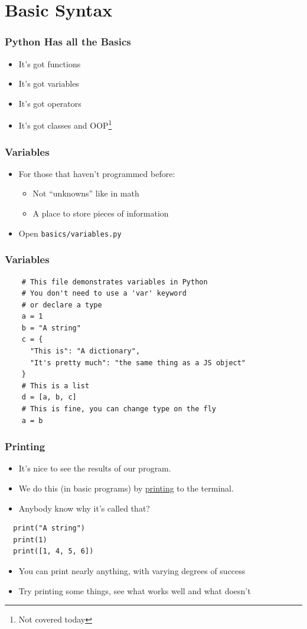 \documentclass{beamer}
\begin{document}
\section{Basic Syntax}
\begin{frame}
  \frametitle{Python Has all the Basics}
  \begin{itemize}
    \item It's got functions
    \pause
    \item It's got variables
    \pause
    \item It's got operators
    \pause
    \item It's got classes and OOP\footnote{Not covered today}
  \end{itemize}
\end{frame}
\begin{frame}
  \frametitle{Variables}
  \begin{itemize}
    \item For those that haven't programmed before:
      \begin{itemize}
        \item Not ``unknowns'' like in math
        \item A place to store pieces of information
      \end{itemize}
    \item Open \texttt{basics/variables.py}
  \end{itemize}
  \pause

\end{frame}
\begin{frame}[fragile]
  \frametitle{Variables}
  \begin{verbatim}
    # This file demonstrates variables in Python
    # You don't need to use a 'var' keyword
    # or declare a type
    a = 1
    b = "A string"
    c = {
      "This is": "A dictionary",
      "It's pretty much": "the same thing as a JS object"
    }
    # This is a list
    d = [a, b, c]
    # This is fine, you can change type on the fly
    a = b
    \end{verbatim}
\end{frame}
\begin{frame}[fragile]
  \frametitle{Printing}
  \begin{itemize}
    \item It's nice to see the results of our program.
    \item We do this (in basic programs) by \underline{printing} to the
          terminal.
    \item Anybody know why it's called that?
    \pause
  \end{itemize}
  \begin{verbatim}
  print("A string")
  print(1)
  print([1, 4, 5, 6])
  \end{verbatim}
  \begin{itemize}
    \item You can print nearly anything, with varying degrees of success
    \item Try printing some things, see what works well and what doesn't
  \end{itemize}
\end{frame}
\end{document}
